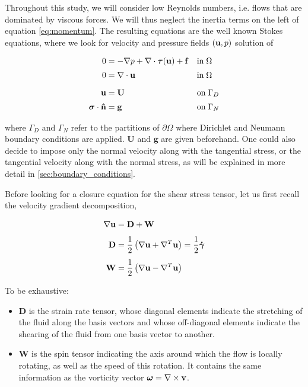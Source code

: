 \documentclass[11 pt]{report}
\begin{document}
Throughout this study, we will consider low Reynolds numbers, i.e. flows that are dominated by viscous forces. We will thus neglect the inertia terms on the left of equation \eqref{eq:momentum}. The resulting equations are the well known Stokes equations, where we look for velocity and pressure fields $(\mathbf{u},p)$ solution of
\begin{empheqboxed}
    \begin{align}
        0 &= -\nabla p + \nabla \cdot \boldsymbol \tau(\mathbf{u}) + \mathbf{f} &&\text{in} \; \Omega \label{eq:momentum} \\[2pt]
        0 &= \nabla \cdot \mathbf{u} &&\text{in}\; \Omega \label{eq:mass}\\[6pt]
        \mathbf{u} &= \mathbf{U} &&\text{on}\; \Gamma_{D} \label{eq:Dirichlet}\\[2pt]
        \boldsymbol \sigma \cdot \mathbf{\hat n} &= \mathbf{g} &&\text{on}\; \Gamma_{N} \label{eq:Neumann}
    \end{align}
\end{empheqboxed}
where $\Gamma_{D}$ and $\Gamma_{N}$ refer to the partitions of $\partial \Omega$ where Dirichlet and Neumann boundary conditions are applied. $\mathbf{U}$ and $\mathbf{g}$ are given beforehand. One could also decide to impose only the normal velocity along with the tangential stress, or the tangential velocity along with the normal stress, as will be explained in more detail in \cref{sec:boundary_conditions}.

Before looking for a closure equation for the shear stress tensor, let us first recall the velocity gradient decomposition,
\begin{empheqboxed}
    \begin{align}
        \nabla \mathbf{u} &= \mathbf{D} + \mathbf{W}\\[4pt]
        \mathbf{D} &= \frac{1}{2} \left(\nabla \mathbf{u} + \nabla^T \mathbf{u}\right) = \frac{1}{2} \boldsymbol{\dot \gamma}\\[4pt]
        \mathbf{W} &= \frac{1}{2} \left(\nabla \mathbf{u} - \nabla^T \mathbf{u}\right)
    \end{align}
\end{empheqboxed}

To be exhaustive:
\begin{itemize}[label=---]
    \item $\mathbf{D}$ is the strain rate tensor, whose diagonal elements indicate the stretching of the fluid along the basis vectors and whose off-diagonal elements indicate the shearing of the fluid from one basis vector to another.
    \item $\mathbf{W}$ is the spin tensor indicating the axis around which the flow is locally rotating, as well as the speed of this rotation. It contains the same information as the vorticity vector $\boldsymbol\omega = \nabla \times \mathbf{v}$.
\end{itemize} 
\end{document}
